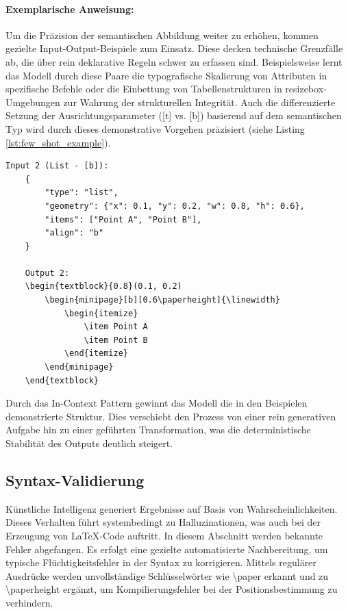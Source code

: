 \documentclass[a4paper]{article}
\begin{document}
\paragraph{Exemplarische Anweisung:}
Um die Präzision der semantischen Abbildung weiter zu erhöhen, kommen gezielte Input-Output-Beispiele zum Einsatz. Diese decken technische Grenzfälle ab, die über rein deklarative Regeln schwer zu erfassen sind. Beispielsweise lernt das Modell durch diese Paare die typografische Skalierung von Attributen in spezifische Befehle oder die Einbettung von Tabellenstrukturen in {resizebox}-Umgebungen zur Wahrung der strukturellen Integrität. Auch die differenzierte Setzung der Ausrichtungsparameter ({[t]} vs. {[b]}) basierend auf dem semantischen Typ wird durch dieses demonstrative Vorgehen präzisiert (siehe Listing \ref{lst:few_shot_example}).


\begin{lstlisting}[basicstyle=\small\ttfamily, frame=lines, caption={Beispielhafte Instanz für die In-Context-Konditionierung}, label={lst:few_shot_example}]
	Input 2 (List - [b]):
	{
		"type": "list",
		"geometry": {"x": 0.1, "y": 0.2, "w": 0.8, "h": 0.6},
		"items": ["Point A", "Point B"],
		"align": "b"
	}
	
	Output 2:
	\begin{textblock}{0.8}(0.1, 0.2)
		\begin{minipage}[b][0.6\paperheight]{\linewidth}
			\begin{itemize}
				\item Point A
				\item Point B
			\end{itemize}
		\end{minipage}
	\end{textblock}
\end{lstlisting}

Durch das {In-Context Pattern} gewinnt das Modell die in den Beispielen demonstrierte Struktur. Dies verschiebt den Prozess von einer rein generativen Aufgabe hin zu einer geführten Transformation, was die deterministische Stabilität des Outputs deutlich steigert.

\subsection{Syntax-Validierung}


Künstliche Intelligenz generiert Ergebnisse auf Basis von Wahrscheinlichkeiten. Dieses Verhalten führt systembedingt zu Halluzinationen, was auch bei der Erzeugung von LaTeX-Code auftritt. In diesem Abschnitt werden bekannte Fehler abgefangen. Es erfolgt eine gezielte automatisierte Nachbereitung, um typische Flüchtigkeitsfehler in der Syntax zu korrigieren. Mittels regulärer Ausdrücke werden unvollständige Schlüsselwörter wie \textbackslash paper erkannt und zu \textbackslash paperheight ergänzt, um Kompilierungsfehler bei der Positionsbestimmung zu verhindern.\\
\end{document}
